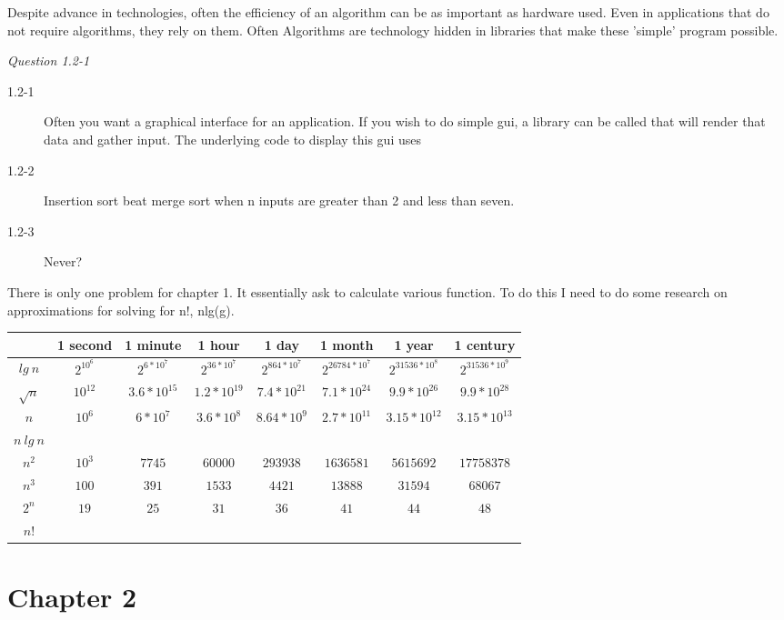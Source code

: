 \documentclass{article}
\begin{document}
Despite advance in technologies, often the efficiency of an algorithm can be as
important as hardware used. Even in applications that do not require
algorithms, they rely on them. Often Algorithms are technology hidden in
libraries that make these 'simple' program possible. 

\textit{Question 1.2-1}
\begin{description}
\item[1.2-1]
Often you want a graphical interface for an application. If you wish to do
simple gui, a library can be called that will render that data and gather
input. The underlying code to display this gui uses   
\item[1.2-2]
Insertion sort beat merge sort when n inputs are greater than 2 and less than
seven. 
\item[1.2-3] 
Never?
\end{description}
There is only one problem for chapter 1. It essentially ask to calculate
various function. To do this I need to do some research on approximations for
solving for n!, nlg(g).
\begin{table}
\begin{center}
\begin{tabular}{|c||c|c|c|c|c|c|c|}
\hline
 & 1 second & 1 minute & 1 hour & 1 day & 1 month & 1 year & 1 century \\ \hline \hline 
$lg\:n$     & $2^{10^6}$ & $2^{6*10^7}$ & $2^{36*10^7}$ & $2^{864*10^7}$ &
$2^{26784*10^7}$ & $2^{31536*10^8}$ & $2^{31536*10^9}$ \\ \hline 
$\sqrt{n}$  & $10^{12}$ & $3.6*10^{15}$ &  $1.2*10^{19}$ & $7.4*10^{21}$ &
$7 .1*10^{24}$ &  $9.9*10^{26}$ & $9.9*10^{28}$ \\ \hline 
$n$         & $10^{6}$ &  $6*10^{7}$ & $3.6*10^{8}$ &  $8.64*10^{9}$ &
$2.7*10^{11}$ &  $3.15*10^{12}$ & $3.15*10^{13}$  \\ \hline 
$n\:lg\:n$  & & & & & & & \\ \hline 
$n^2$       &  $10^3$ & $7745$ & $60000$ & $293938$ & $1636581$ & $5615692$ &
$17758378$ \\ \hline 
$n^3$       & $100$ & $391$ & $1533$ & $4421$ & $13888$ & $31594$ & $68067$ \\ \hline 
$2^n$       & $19$ & $25$ & $31$ & $36$ & $41$ &  $44$ & $48$ \\ \hline 
$n!$        & & & & & & & \\ \hline 
\end{tabular}
\end{center}
\end{table}

\section*{Chapter 2}
\end{document}

